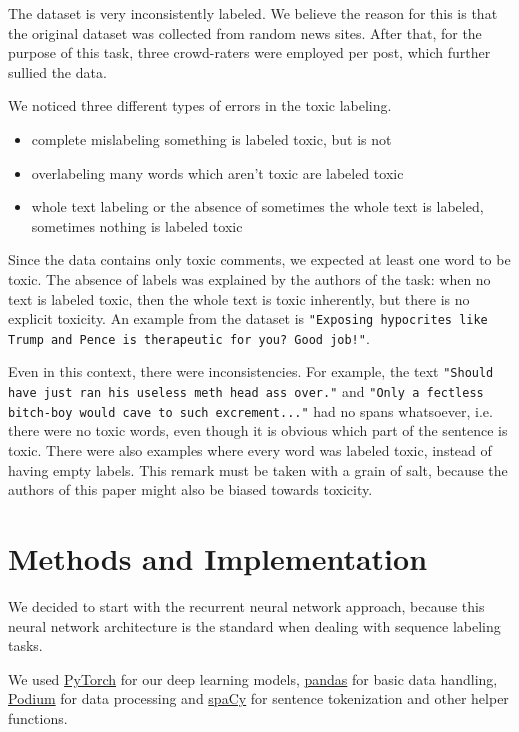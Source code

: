 \documentclass{article}
\begin{document}
The dataset is very inconsistently labeled. We believe the reason for this is that the original dataset was collected from random news sites. After that, for the purpose of this task, three crowd-raters were employed per post, which further sullied the data. 

We noticed three different types of errors in the toxic labeling. 
\begin{itemize}
\item complete mislabeling
\subitem something is labeled toxic, but is not
\item overlabeling
\subitem many words which aren't toxic are labeled toxic
\item whole text labeling or the absence of
\subitem sometimes the whole text is labeled, sometimes nothing is labeled toxic
\end{itemize}

Since the data contains only toxic comments, we expected at least one word to be toxic. The absence of labels was explained by the authors of the task: when no text is labeled toxic, then the whole text is toxic inherently, but there is no explicit toxicity. An example from the dataset is \texttt{"Exposing hypocrites like Trump and Pence is therapeutic for you? Good job!"}. 

Even in this context, there were inconsistencies. For example, the text \texttt{"Should have just ran his useless meth head ass over."} and \texttt{"Only a fectless bitch-boy would cave to such excrement..."} had no spans whatsoever, i.e. there were no toxic words, even though it is obvious which part of the sentence is toxic. There were also examples where every word was labeled toxic, instead of having empty labels. This remark must be taken with a grain of salt, because the authors of this paper might also be biased towards toxicity. 

\section{Methods and Implementation}
We decided to start with the recurrent neural network approach, because this neural network architecture is the standard when dealing with sequence labeling tasks.

We used \href{https://pytorch.org/}{PyTorch} for our deep learning models, \href{https://pandas.pydata.org/}{pandas} for basic data handling, \href{http://takelab.fer.hr/podium/index.html}{Podium} for data processing and \href{https://spacy.io/}{spaCy} for sentence tokenization and other helper functions. 
\end{document}

